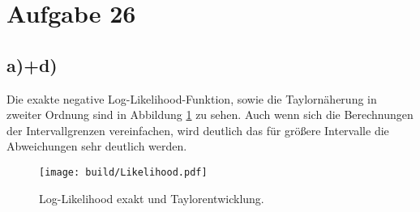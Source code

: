 \section*{Aufgabe 26}
\label{sec:Aufgabe3}



\subsection*{a)+d)}
Die exakte negative Log-Likelihood-Funktion, sowie die Taylornäherung in zweiter Ordnung sind in Abbildung \ref{fig:taylor} zu sehen.
Auch wenn sich die Berechnungen der Intervallgrenzen vereinfachen, wird deutlich das für größere Intervalle die Abweichungen sehr deutlich werden.

\begin{figure}
\centering
\texttt{[image: build/Likelihood.pdf]}
\caption{Log-Likelihood exakt und Taylorentwicklung.}
\label{fig:taylor}
\end{figure}
